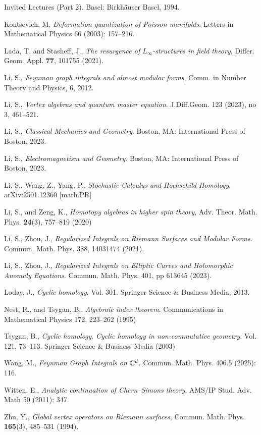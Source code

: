 \begin{enumerate}[label={[\arabic*]},leftmargin=2.8em,itemsep=0.18em,topsep=0.4em]
        Invited Lectures (Part 2). Basel: Birkhäuser Basel, 1994.
  \item Kontsevich, M, \textit{Deformation quantization of Poisson manifolds}.
        Letters in Mathematical Physics 66 (2003): 157--216.
  \item Lada, T. and Stasheff, J., \textit{The resurgence of $L_{\infty}$-structures
        in field theory}, Differ. Geom. Appl. \textbf{77}, 101755 (2021).
  \item Li, S., \textit{Feynman graph integrals and almost modular forms}, Comm. in
        Number Theory and Physics, 6, 2012.
  \item Li, S., \textit{Vertex algebras and quantum master equation}. J.Diff.Geom.
        123 (2023), no 3, 461--521.
  \item Li, S., \textit{Classical Mechanics and Geometry}. Boston, MA: International
        Press of Boston, 2023.
  \item Li, S., \textit{Electromagnetism and Geometry}. Boston, MA: International
        Press of Boston, 2023.
  \item Li, S., Wang, Z., Yang, P., \textit{Stochastic Calculus and Hochschild
        Homology}, arXiv:2501.12360 [math.PR]
  \item Li, S., and Zeng, K., \textit{Homotopy algebras in higher spin theory},
        Adv. Theor. Math. Phys. \textbf{24}(3), 757--819 (2020)
  \item Li, S., Zhou, J., \textit{Regularized Integrals on Riemann Surfaces and
        Modular Forms}. Commun. Math. Phys. 388, 14031474 (2021).
  \item Li, S., Zhou, J., \textit{Regularized Integrals on Elliptic Curves and
        Holomorphic Anomaly Equations}. Commun. Math. Phys. 401, pp 613645 (2023).
  \item Loday, J., \textit{Cyclic homology}. Vol. 301. Springer Science \& Business
        Media, 2013.
  \item Nest, R., and Tsygan, B., \textit{Algebraic index theorem}. Communications
        in Mathematical Physics 172, 223--262 (1995)
  \item Tsygan, B., \textit{Cyclic homology}. \textit{Cyclic homology in
        non-commutative geometry}. Vol. 121, 73--113. Springer Science \& Business
        Media (2003)
  \item Wang, M., \textit{Feynman Graph Integrals on $\mathbb{C}^d$}. Commun. Math. Phys.
        406.5 (2025): 116.
  \item Witten, E., \textit{Analytic continuation of Chern--Simons theory}. AMS/IP
        Stud. Adv. Math 50 (2011): 347.
  \item Zhu, Y., \textit{Global vertex operators on Riemann surfaces}, Commun. Math.
        Phys. \textbf{165}(3), 485--531 (1994).
\end{enumerate}
\endgroup
